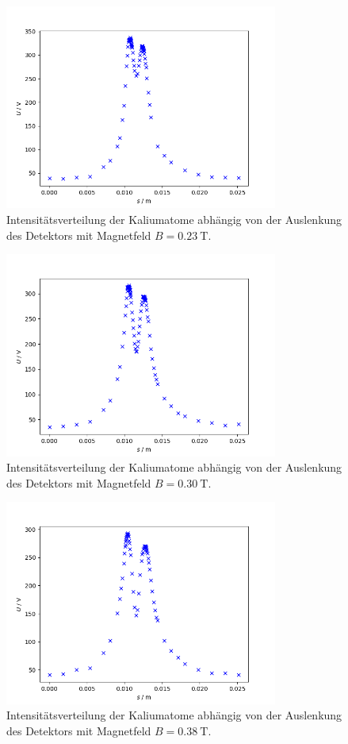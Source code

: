 \begin{figure}
\centering
\includegraphics[width=0.8\textwidth]{python/plots/plot_2.png}
\caption{Intensitätsverteilung der Kaliumatome abhängig von der Auslenkung des Detektors mit Magnetfeld $B=\SI{0.23}{\tesla}$.}
\label{fig:a:2}
\end{figure}
\begin{figure}
\centering
\includegraphics[width=0.8\textwidth]{python/plots/plot_3.png}
\caption{Intensitätsverteilung der Kaliumatome abhängig von der Auslenkung des Detektors mit Magnetfeld $B=\SI{0.30}{\tesla}$.}
\label{fig:a:3}
\end{figure}
\begin{figure}
\centering
\includegraphics[width=0.8\textwidth]{python/plots/plot_4.png}
\caption{Intensitätsverteilung der Kaliumatome abhängig von der Auslenkung des Detektors mit Magnetfeld $B=\SI{0.38}{\tesla}$.}
\label{fig:a:4}
\end{figure}

